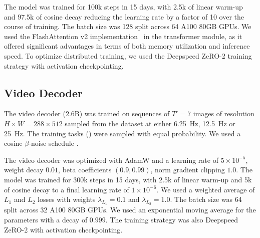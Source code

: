 The model was trained for 100k steps in 15 days, with 2.5k of linear warm-up and 97.5k of cosine decay reducing the learning rate by a factor of 10 over the course of training. The batch size was 128 split across 64 A100 80GB GPUs. We used the FlashAttention v2 implementation~\citep{dao2022flashattention} in the transformer module, as it offered significant advantages in terms of both memory utilization and inference speed. To optimize distributed training, we used the Deepspeed ZeRO-2 training strategy \citep{rasley20} with activation checkpointing.



\subsection{Video Decoder}

The video decoder (2.6B) was trained on sequences of $T'=7$ images of resolution $H\times W = 288 \times 512$ sampled from the dataset at either \SI{6.25}{\hertz}, \SI{12.5}{\hertz} or \SI{25}{\hertz}. The training tasks () were sampled with equal probability. We used a cosine $\beta$-noise schedule \citep{hoogeboom2023simple}.

The video decoder was optimized with AdamW and a learning rate of $5\times 10^{-5}$, weight decay $0.01$, beta coefficients $(0.9, 0.99)$, norm gradient clipping $1.0$. The model was trained for 300k steps in 15 days, with 2.5k of linear warm-up and 5k of cosine decay to a final learning rate of $1\times 10^{-6}$. We used a weighted average of $L_1$ and $L_2$ losses with weights $\lambda_{L_1}=0.1$ and $\lambda_{L_2}=1.0$. The batch size was 64 split across 32 A100 80GB GPUs. We used an exponential moving average for the parameters with a decay of $0.999$. The training strategy was also Deepspeed ZeRO-2 with activation checkpointing.


